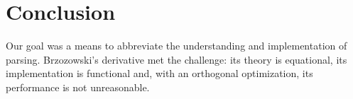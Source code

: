 \section{Conclusion} 
Our goal was a means
to abbreviate the understanding and
implementation of parsing.
%
Brzozowski's derivative met the challenge:
its theory is equational, 
its implementation is functional
 and, with an orthogonal optimization,
its performance is not unreasonable.



